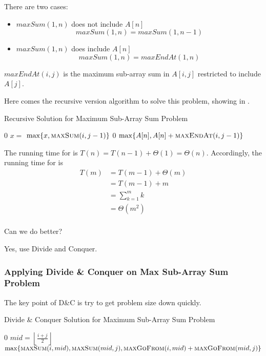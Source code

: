 There are two cases:

\begin{itemize}
    \item $maxSum(1, n)$ does not include $A[n]$
        \[maxSum(1, n) = maxSum(1, n-1)\]
    \item $maxSum(1, n)$ does include $A[n]$
        \[maxSum(1, n) = maxEndAt(1, n)\]
\end{itemize}

$maxEndAt(i, j)$ is the maximum sub-array sum in $A[i, j]$ restricted to include $A[j]$.

Here comes the recursive version algorithm to solve this problem, showing in .

\begin{algorithm}[H]
\caption{Recursive Solution for Maximum Sub-Array Sum Problem}\label{recur_max_sub_sum}
\begin{algorithmic}[1]
    \Return $0$
  \EndIf
  \State $x = $
  \Return $\max\{x, \textsc{maxSum} (i, j-1)\}$
\EndProcedure
{}
        \Return $0$
    \EndIf
    \Return $\max\{A[n], A[n] + \textsc{maxEndAt} (i, j-1)\}$
\EndProcedure
\end{algorithmic}
\end{algorithm}

The running time for  is $T(n) = T(n-1) + \Theta(1) = \Theta(n)$.
Accordingly, the running time for  is
\begin{align*}
    T(m) &= T(m-1) + \Theta(m) \\
         &= T(m-1) + m \\
         &= \sum_{k=1}^m k \\
         &= \Theta(m^2) \\
\end{align*}

Can we do better?

Yes, use Divide and Conquer.

\subsubsection{Applying Divide \& Conquer on Max Sub-Array Sum Problem}

The key point of D\&C is try to get problem size down quickly.

\begin{algorithm}[H]
    \caption{Divide \& Conquer Solution for Maximum Sub-Array Sum Problem}\label{dc_max_sub_sum}
\begin{algorithmic}[1]
    \Return $0$
  \EndIf
  \State $mid = \left\lfloor \frac{i + j}{2} \right\rfloor$
  \Return $\max\{\textsc{maxSum} (i, mid), \textsc{maxSum} (mid, j), \textsc{maxGoFrom} (i, mid) + \textsc{maxGoFrom} (mid, j)\}$
\EndProcedure
\end{algorithmic}
\end{algorithm}


